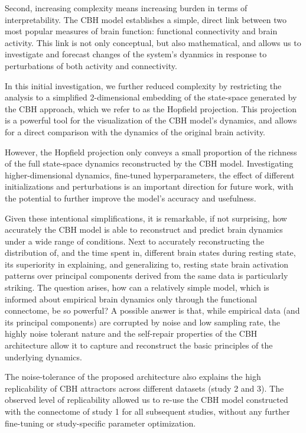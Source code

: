 \documentclass{article}
\begin{document}
Second, increasing complexity means increasing burden in terms of interpretability. The CBH model establishes a simple, direct link between two most popular measures of brain function: functional connectivity and brain activity. This link is not only conceptual, but also mathematical, and allows us to investigate and forecast changes of the system's dyanmics in response to perturbations of both activity and connectivity.

In this initial investigation, we further reduced complexity by restricting the analysis to a simplified 2-dimensional embedding of the state-space generated by the CBH approach, which we refer to as the Hopfield projection. This projection is a powerful tool for the visualization of the CBH model's dynamics, and allows for a direct comparison with the dynamics of the original brain activity.

However, the Hopfield projection only conveys a small proportion of the richness of the full state-space dynamics reconstructed by the CBH model.
Investigating higher-dimensional dynamics, fine-tuned hyperparameters, the effect of different initializations and perturbations is an important direction for future work, with the potential to further improve the model's accuracy and usefulness.

Given these intentional simplifications, it is remarkable, if not surprising, how accurately the CBH model is able to reconstruct and predict brain dynamics under a wide range of conditions. Next to accurately reconstructing the distribution of, and the time spent in, different brain states during resting state, its superiority in explaining, and generalizing to, resting state brain activation patterns over principal components derived from the same data is particularly striking.
The question arises, how can a relatively simple model, which is informed about empirical brain dynamics only through the functional connectome, be so powerful?
A possible answer is that, while empirical data (and its principal components) are corrupted by noise and low sampling rate,
the highly noise tolerant nature and the self-repair properties of the CBH architecture allow it to capture and reconstruct the basic principles of the underlying dynamics.

The noise-tolerance of the proposed architecture also explains the high replicability of CBH attractors across different datasets (study 2 and 3).
The observed level of replicability allowed us to re-use the CBH model constructed with the connectome of study 1 for all subsequent studies, without any further fine-tuning or study-specific parameter optimization.
\end{document}
